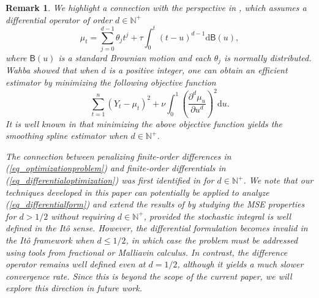 \documentclass[11pt]{article}
\newtheorem{remark}[theorem]{Remark}
\newcommand{\dd}{\mathrm{d}}
\numberwithin{equation}{section}
\numberwithin{figure}{section}
\begin{document}
\begin{remark}
We highlight a connection with the perspective in \cite{wahba1978improper}, which assumes a differential operator of order $d \in \mathbb{N}^+$
\begin{equation}\label{eq_differentialform}
\mu_t = \sum_{j=0}^{d-1} \theta_j t^j + \tau \int_0^t (t - u)^{d-1} \dd \mathsf{B}(u),
\end{equation}
where $\mathsf{B}(u)$ is a standard Brownian motion and each $\theta_j$ is normally distributed. Wahba \cite{wahba1978improper} showed that when $d$ is a positive integer, one can obtain an efficient estimator by minimizing the following objective function
\begin{equation}\label{eq_differentialoptimization}
\sum_{t=1}^n (Y_t - \mu_t)^2 + \nu \int_0^1 \left( \frac{\partial^d \mu_u}{\partial u^d} \right)^2 \dd u.
\end{equation}
It is well known in \cite{wahba1978improper} that minimizing the above objective function yields the smoothing spline estimator when $d \in \mathbb{N}^+$. 

The connection between penalizing finite-order differences in (\ref{eq_optimizationproblem}) and finite-order differentials in (\ref{eq_differentialoptimization}) was first identified in \cite{burman_shumway2009estimation} for $d \in \mathbb{N}^+$. We note that our techniques developed in this paper can potentially be applied to analyze (\ref{eq_differentialform}) and extend the results of \cite{wahba1978improper} by studying the MSE properties for $d > 1/2$ without requiring $d \in \mathbb{N}^+$, provided the stochastic integral is well defined in the Itô sense. However, the differential formulation becomes invalid in the Itô framework when $d \leq 1/2$, in which case the problem must be addressed using tools from fractional or Malliavin calculus. In contrast, the difference operator remains well defined even at $d = 1/2$, although it yields a much slower convergence rate. Since this is beyond the scope of the current paper, we will explore this direction in future work.
\end{remark}

\end{document}
